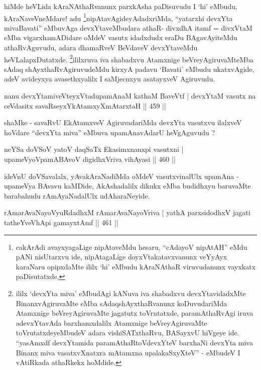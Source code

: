 \begin{artha}
hiMde heVLida kAraNAthaRvanunx parxkAsha paDisuvudu I `hi' eMbudu,
kAraNa\-veVneMdare! adu \footnote[1]{cakArAdi avayxyagaLige nipAtaveMdu
  hesaru, ``cAdayoV nipAtAH'' eMdu pANi nisUtarxvu ide, nipAtagaLige
  doyxVtakatavxvanunx veYyAyx karaNaru opipxdaMte ililx `hi' eMbudu
  kAraNAthaR viruvudanunx vayxkatx paDisutatxde,}nipAtavAgideyAdadxriMda,
``yatarxhi devxYta mivaBavati'' eMbu\-vAga devxYtaveMbudara athaR-
divxdhA itamf = divxVtaM eMba vigarxhamADidare oMdeV vasutx idadxdudx
eraDu BAgavAyiteMdu athaRvAguvudu, adara dhamaRveV BeVdaveV
devxYtaveMdu heVLalapxDutatxde. \footnote[2]{ililx `devxYta miva'
eMbudAgi kANuva iva shabadxvu devxYtavidadxMte BinanxvAgiruvaMte eMba
sAdaqshAyxthaRvanunx koDuvudariMda Atamxnige beVreyAgiruvaMte jagatutx
toVrutatxde, paramAthaRvAgi iruva adevxYtavAda barxhamxdalilx
Atamxnige beVreyAgiruvaMte toVrutatxdeyeMbudeV adara vishiSATxthaRvu,
BASayxvU hiVgeye ide. ``yasAmxdf devxYtamida paramAthaRtoV\s devxYteV
barxhaNi devxYta miva Binanx miva vasatxvXnatxra mAtamxna
upalakaSxyXteV'' - eMbudeV I vAtiRkada athaRkekx hoMdide.}ililxruva iva shabadxvu
Atamxnige beVreyAgiruvaMteMba sAdaq shAyxthaRvAgiruvudeMdu kirxyA
padavu `Bavati' eMbudu ukatxvAgide, adeV avideyxya avasethxyalilx I
saMjecnxyu asatayxveV Agiruvudu.
\end{artha}

\begin{shl}
nanu devxYtamiveVteyxVtadupamAnaM kathaM BaveVtf |
devxYtaM vasutx na ceVdasitx savaRseyxYkAtamxyXmAtarxtaH \hfill  || 459 ||
\end{shl}

\begin{artha}
shaMke - savaRvU EkAtamxveV AgiruvadariMda devxYta vasutxvu ilalxveV hoVdare ``devxYta miva'' eMbuva upamAnavAdarU heVgAguvudu ?
\end{artha}


\begin{shl}
neYSa doVSoV yatoV daqSaTx Ekasimxnanxpi vasutxni |
upameVyoVpamABAvoV digidhxVriva vihAyasi \hfill  || 460 ||
\end{shl}

\begin{artha}
ideVnU doVSavalalx, yAvakAraNadiMda oMdeV vasutxvinalUlx upamAna -
upameVya BAvavu kaMDide, AkAshadalilx dikukx eMba budidhxyu baruvaMte
barabahudu rAmAyaNadalUlx udAharaNeyide.
\end{artha}

\begin{shl}
rAmarAvaNayoVyuRdadhxM rAmarAvaNayoVriva |
yathA parxsidodhxV jagati tatheYveVhApi gamayxtAmf \hfill  || 461 ||
\end{shl}

